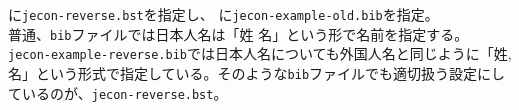 \documentclass[10pt]{jarticle}
\begin{document}
\verb||に\verb|jecon-reverse.bst|を指定し、
\verb||に\verb|jecon-example-old.bib|を指定。
\vspace{1em}\\
普通、\verb|bib|ファイルでは日本人名は「姓 名」という形で名前を指定する。
\verb|jecon-example-reverse.bib|では日本人名についても外国人名と同じように「姓,
名」という形式で指定している。そのような\verb|bib|ファイルでも適切扱う設定にしているのが、\verb|jecon-reverse.bst|。
\vspace{1em}\\



\nocite{*}


% 

%

\end{document}
